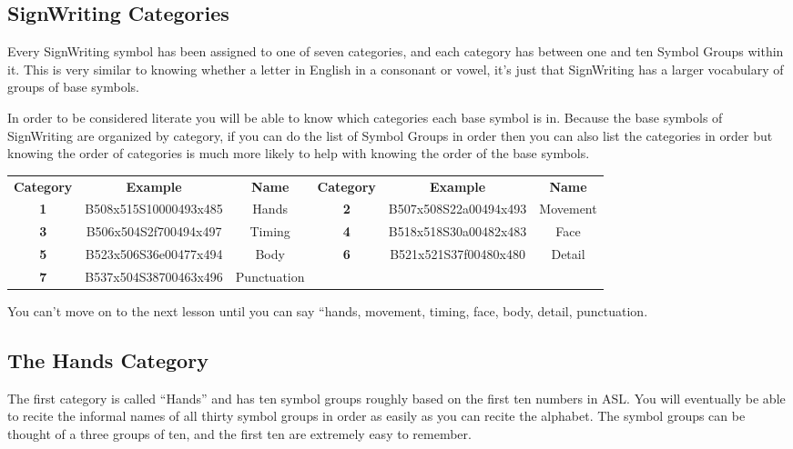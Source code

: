\documentclass{article}
\begin{document}
\subsection{SignWriting Categories}

Every SignWriting symbol has been assigned to one of seven categories, and each category has between one and ten Symbol Groups within it.
This is very similar to knowing whether a letter in English in a consonant or vowel, it's just that SignWriting has a larger vocabulary of groups of base symbols.

In order to be considered literate you will be able to know which categories each base symbol is in.
Because the base symbols of SignWriting are organized by category, if you can do the list of Symbol Groups in order then you can also list the categories in order but knowing the order of categories is much more likely to help with knowing the order of the base symbols.

\begin{center}
\begin{tabular}{ccc@{\hskip 2cm}ccc}
\textbf{Category}&\textbf{Example}&\textbf{Name}&\textbf{Category}&\textbf{Example}&\textbf{Name}\\
\textbf{1}&B508x515S10000493x485&Hands      &\textbf{2}&B507x508S22a00494x493&Movement\\
\textbf{3}&B506x504S2f700494x497&Timing     &\textbf{4}&B518x518S30a00482x483&Face    \\
\textbf{5}&B523x506S36e00477x494&Body       &\textbf{6}&B521x521S37f00480x480&Detail  \\
\textbf{7}&B537x504S38700463x496&Punctuation\\
\end{tabular}
\end{center}

You can't move on to the next lesson until you can say ``hands, movement, timing, face, body, detail, punctuation.

\subsection{The Hands Category}

The first category is called ``Hands'' and has ten symbol groups roughly based on the first ten numbers in ASL.
You will eventually be able to recite the informal names of all thirty symbol groups in order as easily as you can recite the alphabet.
The symbol groups can be thought of a three groups of ten, and the first ten are extremely easy to remember.
\end{document}
